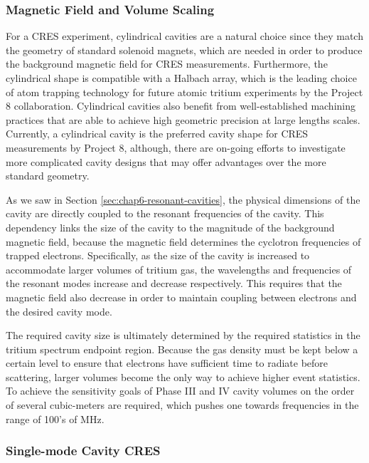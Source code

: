 \subsubsection*{Magnetic Field and Volume Scaling}

For a CRES experiment, cylindrical cavities are a natural choice since they match the geometry of standard solenoid magnets, which are needed in order to produce the background magnetic field for CRES measurements. Furthermore, the cylindrical shape is compatible with a Halbach array, which is the leading choice of atom trapping technology for future atomic tritium experiments by the Project 8 collaboration. Cylindrical cavities also benefit from well-established machining practices that are able to achieve high geometric precision at large lengths scales. Currently, a cylindrical cavity is the preferred cavity shape for CRES measurements by Project 8, although, there are on-going efforts to investigate more complicated cavity designs that may offer advantages over the more standard geometry.

As we saw in Section \ref{sec:chap6-resonant-cavities}, the physical dimensions of the cavity are directly coupled to the resonant frequencies of the cavity. This dependency links the size of the cavity to the magnitude of the background magnetic field, because the magnetic field determines the cyclotron frequencies of trapped electrons. Specifically, as the size of the cavity is increased to accommodate larger volumes of tritium gas, the wavelengths and frequencies of the resonant modes increase and decrease respectively. This requires that the magnetic field also decrease in order to maintain coupling between electrons and the desired cavity mode. 

The required cavity size is ultimately determined by the required statistics in the tritium spectrum endpoint region. Because the gas density must be kept below a certain level to ensure that electrons have sufficient time to radiate before scattering, larger volumes become the only way to achieve higher event statistics. To achieve the sensitivity goals of Phase III and IV cavity volumes on the order of several cubic-meters are required, which pushes one towards frequencies in the range of 100's of MHz.

\subsubsection*{Single-mode Cavity CRES}

